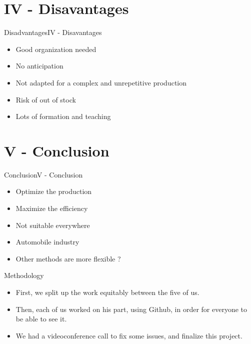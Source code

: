 \documentclass[10pt]{beamer}
\newcommand{\PIV}{IV - Disavantages}
\newcommand{\PV}{V - Conclusion}
\begin{document}
\section{\PIV} 
\begin{frame}{Disadvantages}{\PIV}
    \begin{itemize}
        \item Good organization needed
        \item No anticipation
        \item Not adapted for a complex and unrepetitive production
        \item Risk of out of stock
        \item Lots of formation and teaching
    \end{itemize}
\end{frame}

\section{\PV} 


\begin{frame}{Conclusion}{\PV}
    \begin{itemize}
        \item Optimize the production
        \item Maximize the efficiency
        \item Not suitable everywhere
        \item Automobile industry
        \item Other methods are more flexible ?
    \end{itemize}
\end{frame}


\begin{frame}{Methodology}
    \begin{itemize}
        \item First, we split up the work equitably between the five of us.
        \item Then, each of us worked on his part, using Github, in order for everyone to be able to see it.
        \item We had a videoconference call to fix some issues, and finalize this project.
    \end{itemize}
\end{frame}
\end{document}
